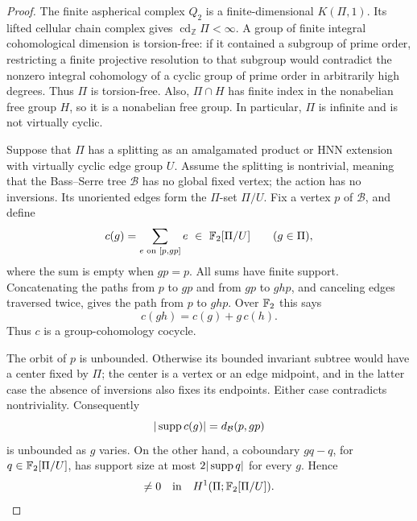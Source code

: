 \begin{proof}
The finite aspherical complex \(Q_2\) is a finite-dimensional
\(K(\Pi,1)\).  Its lifted cellular chain complex gives
\(\operatorname{cd}_{\mathbb Z}\Pi<\infty\).  A group of finite
integral cohomological dimension is torsion-free: if it contained a
subgroup of prime order, restricting a finite projective resolution
to that subgroup would contradict the nonzero integral cohomology of
a cyclic group of prime order in arbitrarily high degrees.  Thus
\(\Pi\) is torsion-free.  Also, \(\Pi\cap H\) has finite index in
the nonabelian free group \(H\), so it is a nonabelian free group.
In particular, \(\Pi\) is infinite and is not virtually cyclic.

Suppose that \(\Pi\) has a splitting as an amalgamated product or HNN
extension with virtually cyclic edge group \(U\).  Assume the
splitting is nontrivial, meaning that the
Bass--Serre tree \(\mathcal B\) has no global fixed vertex; the action
has no inversions.  Its unoriented edges form the \(\Pi\)-set
\(\Pi/U\).  Fix a vertex \(p\) of \(\mathcal B\), and define
\[
c(g)=\sum_{e\text{ on }[p,gp]}e
       \ \in\ \mathbb F_2[\Pi/U]\qquad(g\in\Pi),
\]
where the sum is empty when \(gp=p\).  All sums have finite support.
Concatenating the paths from \(p\) to \(gp\) and from \(gp\) to
\(ghp\), and canceling edges traversed twice, gives the path from
\(p\) to \(ghp\).  Over \(\mathbb F_2\) this says
\[
c(gh)=c(g)+g\,c(h).
\]
Thus \(c\) is a group-cohomology cocycle.

The orbit of \(p\) is unbounded.  Otherwise its bounded invariant
subtree would have a center fixed by \(\Pi\); the center is a vertex
or an edge midpoint, and in the latter case the absence of inversions
also fixes its endpoints.  Either case contradicts nontriviality.
Consequently
\[
|\operatorname{supp} c(g)|=d_{\mathcal B}(p,gp)
\]
is unbounded as \(g\) varies.  On the other hand, a coboundary
\(gq-q\), for \(q\in\mathbb F_2[\Pi/U]\), has support size at most
\(2|\operatorname{supp} q|\) for every \(g\).  Hence
\begin{equation}
[c]\ne0\quad\text{in}\quad H^1(\Pi;\Ftwo[\Pi/U]).
\label{hyp:path-class}
\end{equation}


\end{proof}
